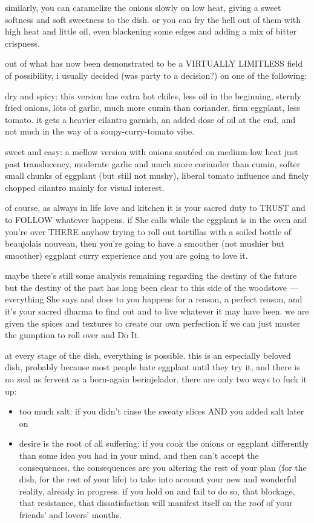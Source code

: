 similarly, you can caramelize the onions slowly on low heat, giving a sweet 
softness and soft sweetness to the dish. or you can fry the hell out of them 
with high heat and little oil, even blackening some edges and adding a mix of 
bitter crispness.

out of what has now been demonstrated to be a VIRTUALLY LIMITLESS field of 
possibility, i usually decided (was party to a decision?) on one of the 
following:

dry and spicy: this version has extra hot chiles, less oil in the beginning, 
sternly fried onions, lots of garlic, much more cumin than coriander, firm 
eggplant, less tomato. it gets a heavier cilantro garnish, an added dose of oil 
at the end, and not much in the way of a soupy-curry-tomato vibe.

sweet and easy: a mellow version with onions saut\'{e}ed on medium-low heat 
just past translucency, moderate garlic and much more coriander than cumin, 
softer small chunks of eggplant (but still not mushy), liberal tomato influence 
and finely chopped cilantro mainly for visual interest.

of course, as always in life love and kitchen it is your sacred duty to TRUST 
and to FOLLOW whatever happens. if She calls while the eggplant is in the oven 
and you're over THERE anyhow trying to roll out tortillas with a soiled bottle 
of beaujolais nouveau, then you're going to have a smoother (not mushier but 
smoother) eggplant curry experience and you are going to love it.

maybe there's still some analysis remaining regarding the destiny of the future 
but the destiny of the past has long been clear to this side of the woodstove 
--- everything She says and does to you happens for a reason, a perfect reason, 
and it's your sacred dharma to find out and to live whatever it may have been. 
we are given the spices and textures to create our own perfection if we can 
just muster the gumption to roll over and Do It.

at every stage of the dish, everything is possible. this is an especially 
beloved dish, probably because most people hate eggplant until they try it, and 
there is no zeal as fervent as a born-again berinjelador. there are only two 
ways to fuck it up:

\begin{itemize}
  \item too much salt: if you didn't rinse the sweaty slices AND you added salt 
  later on
	
  \item desire is the root of all suffering: if you cook the onions or eggplant 
  differently than some idea you had in your mind, and then can't accept the 
  consequences. the consequences are you altering the rest of your plan (for 
  the dish, for the rest of your life) to take into account your new and 
  wonderful reality, already in progress. if you hold on and fail to do so, 
  that blockage, that resistance, that dissatisfaction will manifest itself on 
  the roof of your friends' and lovers' mouths.
\end{itemize}

